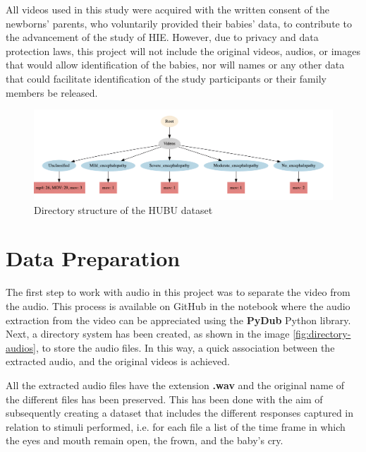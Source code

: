 \begin{tcolorbox}
All videos used in this study were acquired with the written consent of the newborns’ parents, who voluntarily provided their babies’ data, to contribute to the advancement of the study of HIE. However, due to privacy and data protection laws, this project will not include the original videos, audios, or images that would allow identification of the babies, nor will names or any other data that could facilitate identification of the study participants or their family members be released.
\end{tcolorbox}

\begin{figure}[h]
\centering
    \includegraphics[width=1\textwidth]{figures/directory-HUBU.png}
\caption{Directory structure of the HUBU dataset}
\label{fig:HUBU-dataset}
\end{figure}

\newpage
\section{Data Preparation}
The first step to work with audio in this project was to separate the video from the audio. This process is available on GitHub in the notebook  where the audio extraction from the video can be appreciated using the \textbf{PyDub} Python library. Next, a directory system has been created, as shown in the image \ref{fig:directory-audios}, to store the audio files. In this way, a quick association between the extracted audio, and the original videos is achieved. 

All the extracted audio files have the extension \textbf{.wav} and the original name of the different files has been preserved. This has been done with the aim of subsequently creating a dataset that includes the different responses captured in relation to stimuli performed, i.e. for each file a list of the time frame in which the eyes and mouth remain open, the frown, and the baby's cry.

